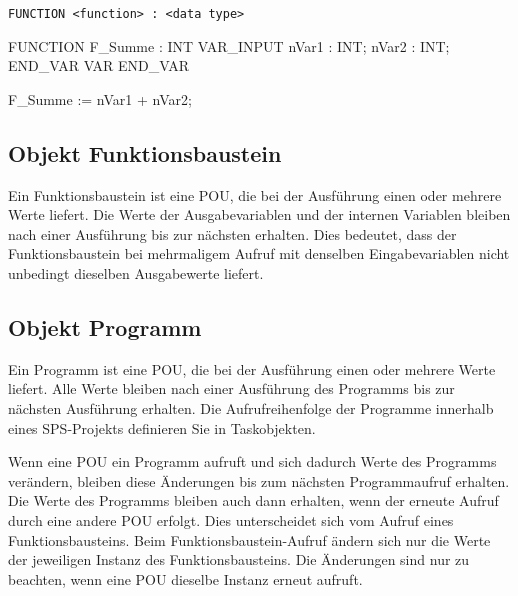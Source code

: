 \documentclass[
  10pt,
  a4paper,
]{article}
\newenvironment{Shaded}{}{}
\newcommand{\NormalTok}[1]{\textcolor[rgb]{0.14,0.16,0.18}{#1}}
\numberwithin{equation}{section}
\begin{document}
\texttt{FUNCTION\ \textless{}function\textgreater{}\ :\ \textless{}data\ type\textgreater{}}

\begin{Shaded}
\begin{Highlighting}[]
\NormalTok{FUNCTION F\_Summe : INT}
\NormalTok{VAR\_INPUT}
\NormalTok{    nVar1 : INT;}
\NormalTok{    nVar2 : INT;}
\NormalTok{END\_VAR}
\NormalTok{VAR}
\NormalTok{END\_VAR}

\NormalTok{F\_Summe := nVar1 + nVar2;}
\end{Highlighting}
\end{Shaded}

\hypertarget{objekt-funktionsbaustein}{%
\subsection{Objekt Funktionsbaustein}\label{objekt-funktionsbaustein}}

Ein Funktionsbaustein ist eine POU, die bei der Ausführung einen oder
mehrere Werte liefert. Die Werte der Ausgabevariablen und der internen
Variablen bleiben nach einer Ausführung bis zur nächsten erhalten. Dies
bedeutet, dass der Funktionsbaustein bei mehrmaligem Aufruf mit
denselben Eingabevariablen nicht unbedingt dieselben Ausgabewerte
liefert.

\hypertarget{objekt-programm}{%
\subsection{Objekt Programm}\label{objekt-programm}}

Ein Programm ist eine POU, die bei der Ausführung einen oder mehrere
Werte liefert. Alle Werte bleiben nach einer Ausführung des Programms
bis zur nächsten Ausführung erhalten. Die Aufrufreihenfolge der
Programme innerhalb eines SPS-Projekts definieren Sie in Taskobjekten.

\begin{tcolorbox}[enhanced jigsaw, leftrule=.75mm, colbacktitle=quarto-callout-important-color!10!white, title=\textcolor{quarto-callout-important-color}{\faExclamation}\hspace{0.5em}{Programm unterscheied zu Funktionsbaustein}, coltitle=black, bottomrule=.15mm, breakable, colback=white, colframe=quarto-callout-important-color-frame, toptitle=1mm, arc=.35mm, bottomtitle=1mm, left=2mm, rightrule=.15mm, toprule=.15mm, opacityback=0, titlerule=0mm, opacitybacktitle=0.6]

Wenn eine POU ein Programm aufruft und sich dadurch Werte des Programms
verändern, bleiben diese Änderungen bis zum nächsten Programmaufruf
erhalten. Die Werte des Programms bleiben auch dann erhalten, wenn der
erneute Aufruf durch eine andere POU erfolgt. Dies unterscheidet sich
vom Aufruf eines Funktionsbausteins. Beim Funktionsbaustein-Aufruf
ändern sich nur die Werte der jeweiligen Instanz des Funktionsbausteins.
Die Änderungen sind nur zu beachten, wenn eine POU dieselbe Instanz
erneut aufruft.

\end{tcolorbox}
\end{document}
